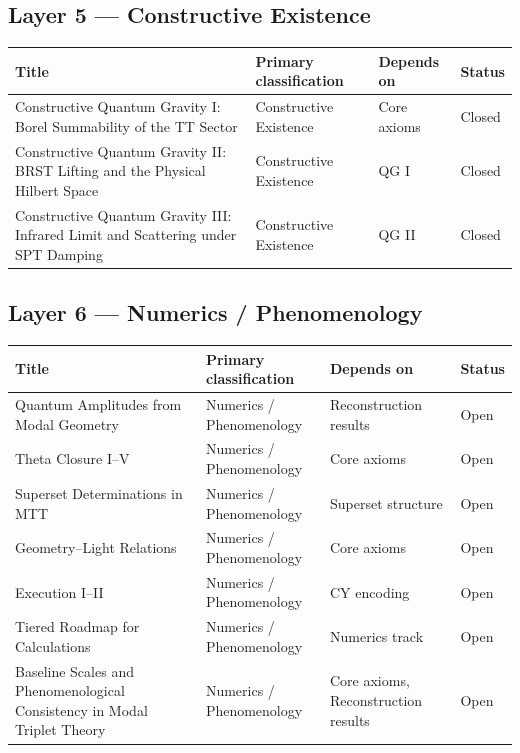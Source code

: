 \documentclass[11pt]{article}
\begin{document}
\subsection{Layer 5 --- Constructive Existence}

\begin{center}
\small
\begin{tabular}{|p{7.2cm}|p{3.6cm}|p{3.6cm}|p{1.6cm}|}
\hline
\textbf{Title} & \textbf{Primary classification} & \textbf{Depends on} & \textbf{Status}\\
\hline
Constructive Quantum Gravity I: Borel Summability of the TT Sector
& Constructive Existence & Core axioms & Closed\\
\hline
Constructive Quantum Gravity II: BRST Lifting and the Physical Hilbert Space
& Constructive Existence & QG I & Closed\\
\hline
Constructive Quantum Gravity III: Infrared Limit and Scattering under SPT Damping
& Constructive Existence & QG II & Closed\\
\hline
\end{tabular}
\end{center}

\subsection{Layer 6 --- Numerics / Phenomenology}

\begin{center}
\small
\begin{tabular}{|p{7.2cm}|p{3.6cm}|p{3.6cm}|p{1.6cm}|}
\hline
\textbf{Title} & \textbf{Primary classification} & \textbf{Depends on} & \textbf{Status}\\
\hline
Quantum Amplitudes from Modal Geometry
& Numerics / Phenomenology & Reconstruction results & Open\\
\hline
Theta Closure I--V
& Numerics / Phenomenology & Core axioms & Open\\
\hline
Superset Determinations in MTT
& Numerics / Phenomenology & Superset structure & Open\\
\hline
Geometry--Light Relations
& Numerics / Phenomenology & Core axioms & Open\\
\hline
Execution I--II
& Numerics / Phenomenology & CY encoding & Open\\
\hline
Tiered Roadmap for Calculations
& Numerics / Phenomenology & Numerics track & Open\\
\hline
Baseline Scales and Phenomenological Consistency in Modal Triplet Theory
& Numerics / Phenomenology
& Core axioms, Reconstruction results
& Open\\
\hline
\end{tabular}
\end{center}
\end{document}
